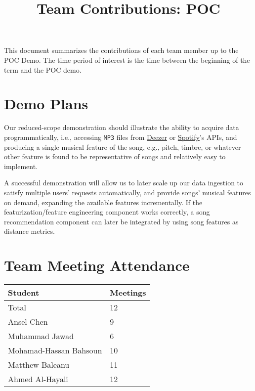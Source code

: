 \documentclass{article}
\title{Team Contributions: POC\\\progname}
\author{\authname}
\date{}
\begin{document}
\maketitle

This document summarizes the contributions of each team member up to the POC
Demo.  The time period of interest is the time between the beginning of the term
and the POC demo.

\section{Demo Plans}

\begin{description}[leftmargin=0cm]
    \item[Demonstration] Our reduced-scope demonstration should illustrate the ability to acquire data programmatically, i.e., accessing \texttt{MP3} files from \href{https://developers.deezer.com/api}{Deezer} or \href{https://developer.spotify.com/documentation/web-api}{Spotify}'s APIs, and producing a single musical feature of the song, e.g., pitch, timbre, or whatever other feature is found to be representative of songs and relatively easy to implement.
    \item[Post-demonstration] A successful demonstration will allow us to later scale up our data ingestion to satisfy multiple users' requests automatically, and provide songs' musical features on demand, expanding the available features incrementally. If the featurization/feature engineering component works correctly, a song recommendation component can later be integrated by using song features as distance metrics.
\end{description}

\section{Team Meeting Attendance}



\begin{table}[H]
\centering
\begin{tabular}{ll}
\toprule
\textbf{Student} & \textbf{Meetings}\\
\midrule
Total & 12\\
Ansel Chen & 9\\
Muhammad Jawad & 6\\
Mohamad-Hassan Bahsoun & 10\\
Matthew Baleanu & 11\\
Ahmed Al-Hayali & 12\\
\bottomrule
\end{tabular}
\end{table}
\end{document}
